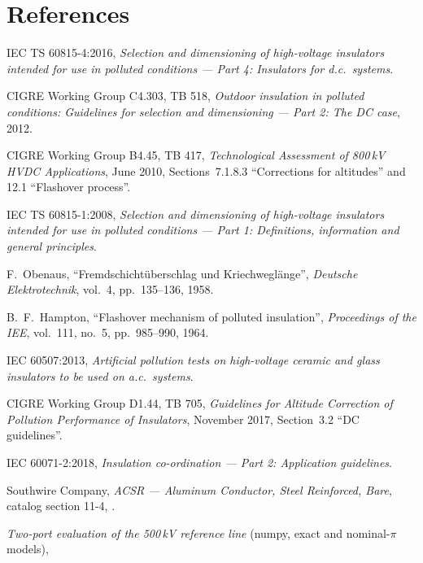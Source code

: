 \section{References}
\label{sec:references}

\begin{enumerate}[label={[\arabic*]}, leftmargin=*, itemsep=0.4em]
  \item IEC TS 60815-4:2016, \emph{Selection and dimensioning of high-voltage
        insulators intended for use in polluted conditions --- Part 4:
        Insulators for d.c.\ systems}.
  \item CIGRE Working Group C4.303, TB 518, \emph{Outdoor insulation in
        polluted conditions: Guidelines for selection and dimensioning ---
        Part 2: The DC case}, 2012.
  \item CIGRE Working Group B4.45, TB 417, \emph{Technological Assessment of
        800\,kV HVDC Applications}, June 2010, Sections~7.1.8.3 ``Corrections for altitudes'' and
        12.1 ``Flashover process''.
  \item IEC TS 60815-1:2008, \emph{Selection and dimensioning of high-voltage
        insulators intended for use in polluted conditions --- Part 1:
        Definitions, information and general principles}.
  \item F.~Obenaus, ``Fremdschichtüberschlag und Kriechweglänge'',
        \emph{Deutsche Elektrotechnik}, vol.~4, pp.~135--136, 1958.
  \item B.~F.~Hampton, ``Flashover mechanism of polluted insulation'',
        \emph{Proceedings of the IEE}, vol.~111, no.~5, pp.~985--990, 1964.
  \item IEC 60507:2013, \emph{Artificial pollution tests on high-voltage
        ceramic and glass insulators to be used on a.c.\ systems}.
  \item CIGRE Working Group D1.44, TB 705, \emph{Guidelines for Altitude
        Correction of Pollution Performance of Insulators}, November 2017,
        Section~3.2 ``DC guidelines''.
  \item IEC 60071-2:2018, \emph{Insulation co-ordination --- Part 2:
        Application guidelines}.
  \item Southwire Company, \emph{ACSR --- Aluminum Conductor, Steel
        Reinforced, Bare}, catalog section 11-4,
        .
  \item \emph{Two-port evaluation of the 500\,kV reference line} (numpy,
        exact and nominal-$\pi$ models),

\end{enumerate}

